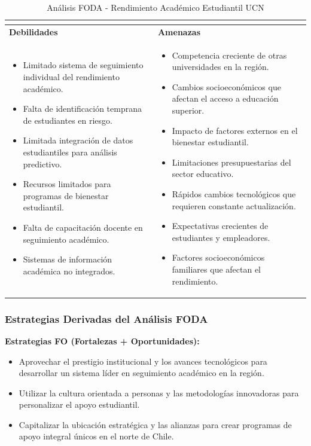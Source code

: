 \documentclass[12pt,letterpaper]{report}
\begin{document}
\begin{table}[H]
\begin{tabular}{|p{}|p{}|}
\begin{itemize}
        \end{itemize} \\
        \hline
        \textbf{Debilidades} & \textbf{Amenazas} \\
        \hline
        \begin{itemize}
            \item Limitado sistema de seguimiento individual del rendimiento académico.
            \item Falta de identificación temprana de estudiantes en riesgo.
            \item Limitada integración de datos estudiantiles para análisis predictivo.
            \item Recursos limitados para programas de bienestar estudiantil.
            \item Falta de capacitación docente en seguimiento académico.
            \item Sistemas de información académica no integrados.
        \end{itemize} & 
        \begin{itemize}
            \item Competencia creciente de otras universidades en la región.
            \item Cambios socioeconómicos que afectan el acceso a educación superior.
            \item Impacto de factores externos en el bienestar estudiantil.
            \item Limitaciones presupuestarias del sector educativo.
            \item Rápidos cambios tecnológicos que requieren constante actualización.
            \item Expectativas crecientes de estudiantes y empleadores.
            \item Factores socioeconómicos familiares que afectan el rendimiento.
        \end{itemize} \\
        \hline
    \end{tabular}
    \caption{Análisis FODA - Rendimiento Académico Estudiantil UCN}
\end{table}

\subsubsection{Estrategias Derivadas del Análisis FODA}

\textbf{Estrategias FO (Fortalezas + Oportunidades):}
\begin{itemize}
    \item Aprovechar el prestigio institucional y los avances tecnológicos para desarrollar un sistema líder en seguimiento académico en la región.
    \item Utilizar la cultura orientada a personas y las metodologías innovadoras para personalizar el apoyo estudiantil.
    \item Capitalizar la ubicación estratégica y las alianzas para crear programas de apoyo integral únicos en el norte de Chile.
\end{itemize}
\end{document}
